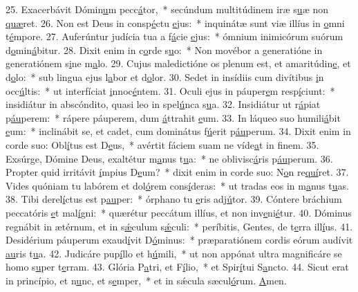 25. Exacerbávit Dómin\uline{u}m pecc\uline{á}tor,~* secúndum multitúdinem iræ s\uline{u}æ non \uline{quæ}ret.
26. Non est Deus in consp\uline{é}ctu \uline{e}jus:~* inquinátæ sunt viæ illíus in \uline{o}mni t\uline{é}mpore.
27. Auferúntur judícia tua a f\uline{á}cie \uline{e}jus:~* ómnium inimicórum suórum d\uline{o}min\uline{á}bitur.
28. Dixit enim in c\uline{o}rde s\uline{u}o:~* Non movébor a generatióne in generatiónem s\uline{i}ne m\uline{a}lo.
29. Cujus maledictióne os plenum est, et amaritúdin\uline{e}, et d\uline{o}lo:~* sub lingua ejus l\uline{a}bor et d\uline{o}lor.
30. Sedet in insídiis cum divítibus \uline{i}n occ\uline{ú}ltis:~* ut interfíciat \uline{i}nnoc\uline{é}ntem.
31. Oculi ejus in páuper\uline{e}m resp\uline{í}ciunt:~* insidiátur in abscóndito, quasi leo in spel\uline{ú}nca s\uline{u}a.
32. Insidiátur ut r\uline{á}piat p\uline{áu}perem:~* rápere páuperem, dum \uline{á}ttrahit \uline{e}um.
33. In láqueo suo humili\uline{á}bit \uline{e}um:~* inclinábit se, et cadet, cum dominátus f\uline{ú}erit p\uline{áu}perum.
34. Dixit enim in corde suo: Obl\uline{í}tus est D\uline{e}us,~* avértit fáciem suam ne víde\uline{a}t in f\uline{i}nem.
35. Exsúrge, Dómine Deus, exaltétur m\uline{a}nus t\uline{u}a:~* ne oblivisc\uline{á}ris p\uline{áu}perum.
36. Propter quid irritávit \uline{í}mpius D\uline{e}um?~* dixit enim in corde suo: N\uline{o}n re\uline{quí}ret.
37. Vides quóniam tu labórem et dol\uline{ó}rem cons\uline{í}deras:~* ut tradas eos in m\uline{a}nus t\uline{u}as.
38. Tibi derel\uline{í}ctus est p\uline{au}per:~* órphano tu \uline{e}ris adj\uline{ú}tor.
39. Cóntere bráchium peccatóris \uline{e}t mal\uline{í}gni:~* quærétur peccátum illíus, et non inv\uline{e}ni\uline{é}tur.
40. Dóminus regnábit in ætérnum, et in s\uline{ǽ}culum s\uline{ǽ}culi:~* períbitis, Gentes, de t\uline{e}rra ill\uline{í}us.
41. Desidérium páuperum exaud\uline{í}vit D\uline{ó}minus:~* præparatiónem cordis eórum audívit \uline{au}ris t\uline{u}a.
42. Judicáre pup\uline{í}llo et h\uline{ú}mili,~* ut non appónat ultra magnificáre se homo s\uline{u}per t\uline{e}rram.
43. Glória P\uline{a}tri, et F\uline{í}lio,~* et Spir\uline{í}tui S\uline{a}ncto.
44. Sicut erat in princípio, et n\uline{u}nc, et s\uline{e}mper,~* et in sǽcula sæcul\uline{ó}rum. \uline{A}men.
